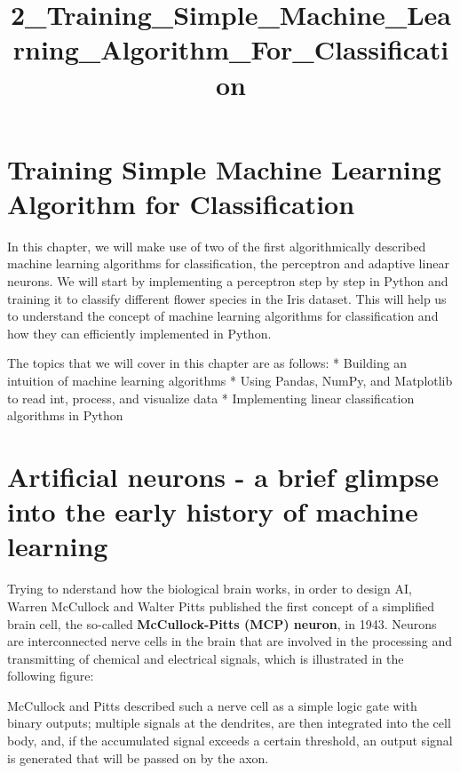 \documentclass[11pt]{article}
\title{2\_Training\_Simple\_Machine\_Learning\_Algorithm\_For\_Classification}
\begin{document}
    
    
    \maketitle
    
    

    
    \section{Training Simple Machine Learning Algorithm for
Classification}\label{training-simple-machine-learning-algorithm-for-classification}

    In this chapter, we will make use of two of the first algorithmically
described machine learning algorithms for classification, the perceptron
and adaptive linear neurons. We will start by implementing a perceptron
step by step in Python and training it to classify different flower
species in the Iris dataset. This will help us to understand the concept
of machine learning algorithms for classification and how they can
efficiently implemented in Python.

    The topics that we will cover in this chapter are as follows: * Building
an intuition of machine learning algorithms * Using Pandas, NumPy, and
Matplotlib to read int, process, and visualize data * Implementing
linear classification algorithms in Python

    \section{Artificial neurons - a brief glimpse into the early history of
machine
learning}\label{artificial-neurons---a-brief-glimpse-into-the-early-history-of-machine-learning}

    Trying to nderstand how the biological brain works, in order to design
AI, Warren McCullock and Walter Pitts published the first concept of a
simplified brain cell, the so-called \textbf{McCullock-Pitts (MCP)
neuron}, in 1943. Neurons are interconnected nerve cells in the brain
that are involved in the processing and transmitting of chemical and
electrical signals, which is illustrated in the following figure:

    

    McCullock and Pitts described such a nerve cell as a simple logic gate
with binary outputs; multiple signals at the dendrites, are then
integrated into the cell body, and, if the accumulated signal exceeds a
certain threshold, an output signal is generated that will be passed on
by the axon.
\end{document}
